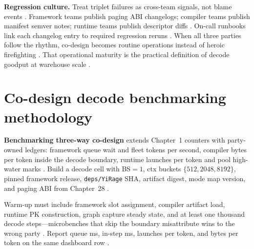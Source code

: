 \textbf{Regression culture.} Treat triplet failures as cross-team signals, not blame events \citep{patel2025llminference,yirage2026,chen2020compilerbasedhardw,kwon2023vllm,taxbreak2026,memoryfloor2026,dlbook}. Framework teams publish paging ABI changelogs; compiler teams publish manifest semver notes; runtime teams publish descriptor diffs \citep{kwon2023vllm,yirage2026,chen2020compilerbasedhardw,patel2025llminference,dlbook}. On-call runbooks link each changelog entry to required regression reruns \citep{patel2025llminference,yirage2026,chen2020compilerbasedhardw,dlbook}. When all three parties follow the rhythm, co-design becomes routine operations instead of heroic firefighting \citep{patel2025llminference,yirage2026,chen2020compilerbasedhardw,kwon2023vllm,taxbreak2026,memoryfloor2026,dlbook}. That operational maturity is the practical definition of decode goodput at warehouse scale \citep{patel2025llminference,taxbreak2026,memoryfloor2026,yirage2026,chen2020compilerbasedhardw,dlbook}.


\section{Co-design decode benchmarking methodology}
\label{sec:ch30_codesign_benchmark}

\textbf{Benchmarking three-way co-design} extends Chapter~1 counters with party-owned ledgers: framework queue wait and fleet tokens per second, compiler bytes per token inside the decode boundary, runtime launches per token and pool high-water marks \citep{patel2025llminference,yirage2026,chen2020compilerbasedhardw,kwon2023vllm,taxbreak2026,memoryfloor2026,liu2024deepseekv3,nvidia2024cudagraphs,dao2022flashattention,amd2024xdna,amd2024aie,dlbook,semianalysis2024tma,dao2023flashdecoding,nvidia2022hopper}. Build a decode cell with BS${=}1$, ctx buckets $\{512,2048,8192\}$, pinned framework release, \texttt{deps/YiRage} SHA, artifact digest, mode map version, and paging ABI from Chapter~28 \citep{kwon2023vllm,yirage2026,chen2020compilerbasedhardw,patel2025llminference,taxbreak2026,memoryfloor2026,liu2024deepseekv3,nvidia2024cudagraphs,dao2022flashattention,amd2024xdna,amd2024aie,dao2023flashdecoding,nvidia2022hopper,semianalysis2024tma,dlbook}.

Warm-up must include framework slot assignment, compiler artifact load, runtime PK construction, graph capture steady state, and at least one thousand decode steps---microbenches that skip the boundary misattribute wins to the wrong party \citep{yirage2026,chen2020compilerbasedhardw,patel2025llminference,kwon2023vllm,nvidia2024cudagraphs,memoryfloor2026,taxbreak2026,liu2024deepseekv3,dao2022flashattention,amd2024xdna,amd2024aie,dao2023flashdecoding,nvidia2022hopper,semianalysis2024tma,dlbook}. Report queue ms, in-step ms, launches per token, and bytes per token on the same dashboard row \citep{patel2025llminference,taxbreak2026,memoryfloor2026,yirage2026,chen2020compilerbasedhardw,kwon2023vllm,liu2024deepseekv3,nvidia2024cudagraphs,dao2022flashattention,amd2024aie,amd2024xdna,dlbook,dao2023flashdecoding,nvidia2022hopper,semianalysis2024tma}.

